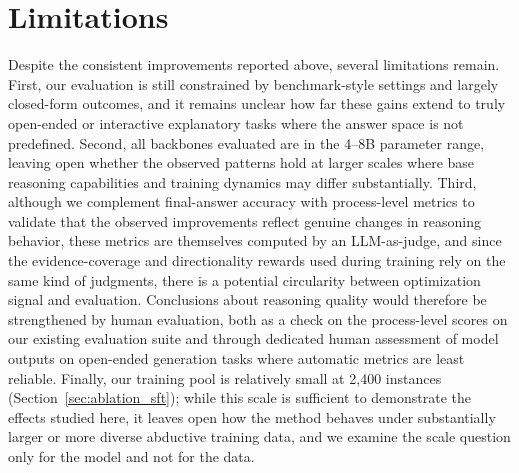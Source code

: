 \documentclass[11pt]{article}
\begin{document}
\section{Limitations}
Despite the consistent improvements reported above, several limitations remain. First, our evaluation is still constrained by benchmark-style settings and largely closed-form outcomes, and it remains unclear how far these gains extend to truly open-ended or interactive explanatory tasks where the answer space is not predefined. Second, all backbones evaluated are in the 4--8B parameter range, leaving open whether the observed patterns hold at larger scales where base reasoning capabilities and training dynamics may differ substantially. Third, although we complement final-answer accuracy with process-level metrics to validate that the observed improvements reflect genuine changes in reasoning behavior, these metrics are themselves computed by an LLM-as-judge, and since the evidence-coverage and directionality rewards used during training rely on the same kind of judgments, there is a potential circularity between optimization signal and evaluation. Conclusions about reasoning quality would therefore be strengthened by human evaluation, both as a check on the process-level scores on our existing evaluation suite and through dedicated human assessment of model outputs on open-ended generation tasks where automatic metrics are least reliable. Finally, our training pool is relatively small at 2{,}400 instances (Section~\ref{sec:ablation_sft}); while this scale is sufficient to demonstrate the effects studied here, it leaves open how the method behaves under substantially larger or more diverse abductive training data, and we examine the scale question only for the model and not for the data.
\end{document}

